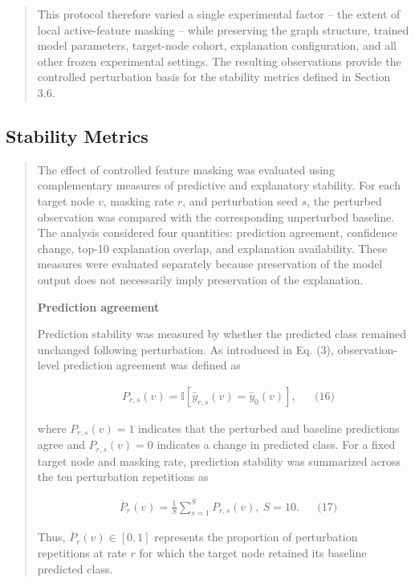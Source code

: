 \documentclass[a4paper]{article}
\begin{document}
\begin{quote}
This protocol therefore varied a single experimental factor -- the
extent of local active-feature masking -- while preserving the graph
structure, trained model parameters, target-node cohort, explanation
configuration, and all other frozen experimental settings. The resulting
observations provide the controlled perturbation basis for the stability
metrics defined in Section 3.6.
\end{quote}

\subsection{Stability Metrics}\label{stability-metrics}

\begin{quote}
The effect of controlled feature masking was evaluated using
complementary measures of predictive and explanatory stability. For each
target node \(v\), masking rate \(r\), and perturbation seed \(s\), the
perturbed observation was compared with the corresponding unperturbed
baseline. The analysis considered four quantities: prediction agreement,
confidence change, top-10 explanation overlap, and explanation
availability. These measures were evaluated separately because
preservation of the model output does not necessarily imply preservation
of the explanation.

\textbf{Prediction agreement}

Prediction stability was measured by whether the predicted class
remained unchanged following perturbation. As introduced in Eq. (3),
observation-level prediction agreement was defined as

\[\begin{matrix}
 & P_{r,s}(v)\mathbb{= I}\left\lbrack {\widehat{y}}_{r,s}(v) = {\widehat{y}}_{0}(v) \right\rbrack, & & \text{(16)}
\end{matrix}
\]

where \(P_{r,s}(v) = 1\) indicates that the perturbed and baseline
predictions agree and \(P_{r,s}(v) = 0\) indicates a change in predicted
class. For a fixed target node and masking rate, prediction stability
was summarized across the ten perturbation repetitions as

\[\begin{matrix}
 & {\overline{P}}_{r}(v) = \frac{1}{S}\sum_{s = 1}^{S}P_{r,s}(v),\ S = 10. & & \text{(17)}
\end{matrix}
\]

Thus, \({\overline{P}}_{r}(v) \in \left\lbrack 0,1 \right\rbrack\)
represents the proportion of perturbation repetitions at rate \(r\) for
which the target node retained its baseline predicted class.


\end{quote}
\end{document}
